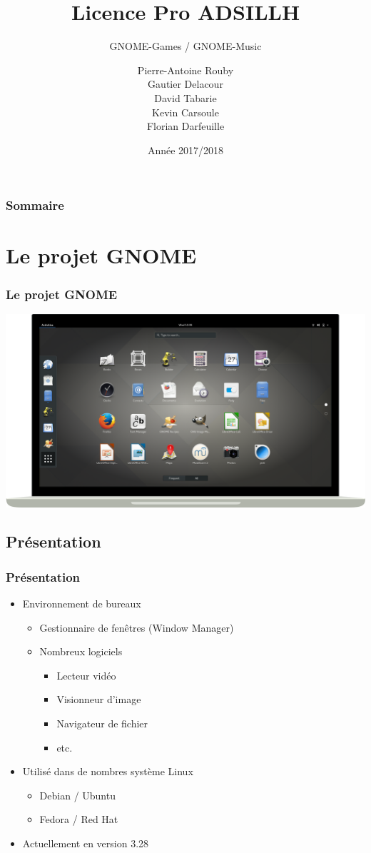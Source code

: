 \documentclass{beamer}
\title{Licence Pro ADSILLH}
\subtitle{GNOME-Games / GNOME-Music}
\author{Pierre-Antoine Rouby\\Gautier Delacour\\
  David Tabarie\\Kevin Carsoule\\Florian Darfeuille}
\date{Année 2017/2018}
\begin{document}
\frame{\titlepage}

\begin{frame}
  \frametitle{Sommaire}
  \tableofcontents
\end{frame}

\section{Le projet GNOME}
\begin{frame}
  \frametitle{Le projet GNOME}
  \includegraphics[scale=0.2]{images/GnomeScreen.png}
\end{frame}

\subsection{Présentation}
\begin{frame}
  \frametitle{Présentation}
  \begin{itemize}
  \item Environnement de bureaux
    \begin{itemize}
    \item Gestionnaire de fenêtres (Window Manager)
    \item Nombreux logiciels
      \begin{itemize} %
      \item Lecteur vidéo
      \item Visionneur d'image
      \item Navigateur de fichier
      \item etc.
      \end{itemize}
    \end{itemize}
  \item Utilisé dans de nombres système Linux
    \begin{itemize}
    \item Debian / Ubuntu
    \item Fedora / Red Hat
    \end{itemize}
  \item Actuellement en version 3.28
  \end{itemize}
\end{frame}
\end{document}
